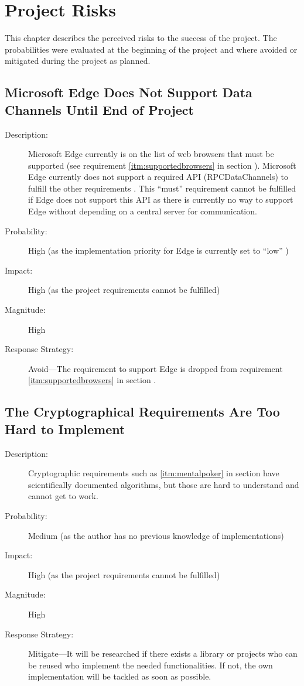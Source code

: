 \chapter{Project Risks}

This chapter describes the perceived risks to the success of the project. The
probabilities were evaluated at the beginning of the project and where avoided
or mitigated during the project as planned.

\section{Microsoft Edge Does Not Support Data Channels Until End of Project}
\label{sec:riskedgedatachannels}

\begin{description}
  \item[Description:] Microsoft Edge currently is on the list of web browsers
  that must be supported (see requirement \ref{itm:supportedbrowsers} in
  section ). Microsoft Edge currently does not support
  a required API (RPCDataChannels) to fulfill the other requirements
  \cite{Microsoft2016datachannels}. This “must” requirement cannot be fulfilled
  if Edge does not support this API as there is currently no way to support
  Edge without depending on a central server for communication.
  \item[Probability:] High (as the implementation priority for Edge is
  currently set to ``low'' \cite{Microsoft2016datachannels})
  \item[Impact:] High (as the project requirements cannot be fulfilled)
  \item[Magnitude:] High
  \item[Response Strategy:] Avoid---The requirement to support Edge is dropped
  from requirement \ref{itm:supportedbrowsers} in section
  .
\end{description}

\section{The Cryptographical Requirements Are Too Hard to Implement}

\begin{description}
  \item[Description:] Cryptographic requirements such as \ref{itm:mentalpoker}
  in section  have scientifically documented
  algorithms, but those are hard to understand and cannot get to work.
  \item[Probability:] Medium (as the author has no previous knowledge of
  implementations)
  \item[Impact:] High (as the project requirements cannot be fulfilled)
  \item[Magnitude:] High
  \item[Response Strategy:] Mitigate---It will be researched if there exists a
  library or projects who can be reused who implement the needed
  functionalities. If not, the own implementation will be tackled as soon as
  possible.
\end{description}

